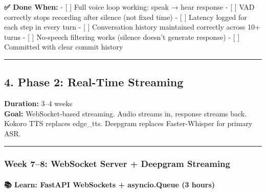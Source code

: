 \documentclass[
  11pt,
]{article}
\begin{document}
\textbf{✅ Done When:} - {[} {]} Full voice loop working: speak → hear
response - {[} {]} VAD correctly stops recording after silence (not
fixed time) - {[} {]} Latency logged for each step in every turn - {[}
{]} Conversation history maintained correctly across 10+ turns - {[} {]}
No-speech filtering works (silence doesn't generate response) - {[} {]}
Committed with clear commit history

\begin{center}\rule{0.5\linewidth}{0.5pt}\end{center}

\hypertarget{phase-2-real-time-streaming}{%
\subsection{4. Phase 2: Real-Time
Streaming}\label{phase-2-real-time-streaming}}

\textbf{Duration:} 3--4 weeks\\
\textbf{Goal:} WebSocket-based streaming. Audio streams in, response
streams back. Kokoro TTS replaces edge\_tts. Deepgram replaces
Faster-Whisper for primary ASR.

\begin{center}\rule{0.5\linewidth}{0.5pt}\end{center}

\hypertarget{week-78-websocket-server-deepgram-streaming}{%
\subsubsection{Week 7--8: WebSocket Server + Deepgram
Streaming}\label{week-78-websocket-server-deepgram-streaming}}

\hypertarget{learn-fastapi-websockets-asyncio.queue-3-hours}{%
\paragraph{📚 Learn: FastAPI WebSockets + asyncio.Queue (3
hours)}\label{learn-fastapi-websockets-asyncio.queue-3-hours}}
\end{document}
